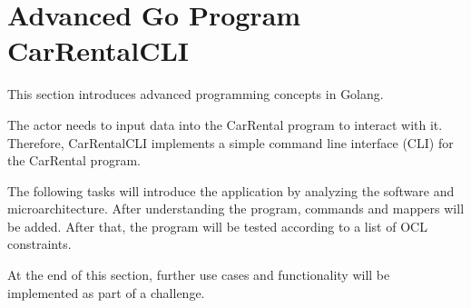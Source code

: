 




\section{Advanced Go Program CarRentalCLI}
\label{sec:advanced_go_program_car_rental_cli}
This section introduces advanced programming concepts in Golang.

The actor needs to input data into the CarRental program to interact with it.
Therefore, CarRentalCLI implements a simple command line interface (CLI) for the CarRental program.

The following tasks will introduce the application by analyzing the software and microarchitecture.
After understanding the program, commands and mappers will be added.
After that, the program will be tested according to a list of OCL constraints.

At the end of this section, further use cases and functionality will be implemented as part of a challenge.





